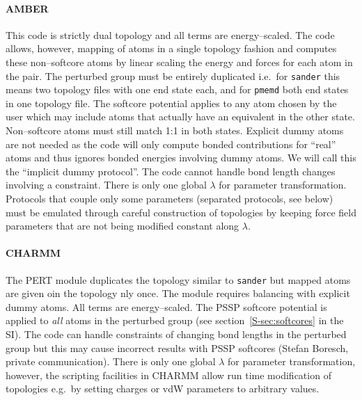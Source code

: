\documentclass[journal=jctcce,manuscript=article]{achemso}
\newcommand{\progname}[1]{\texttt{#1}}
\begin{document}
\paragraph{AMBER} %
This code is strictly dual topology and all terms
are energy--scaled.
The code allows, however, mapping of atoms in a
single topology fashion and computes these non--softcore atoms 
by linear scaling the energy and forces for each atom in the pair.
The perturbed group must be entirely duplicated i.e.\ for \progname{sander} 
this means two topology files with one end state each, and for \progname{pmemd} 
both end states in one topology file.  The softcore potential applies to any 
atom chosen by the user which may include atoms that actually have an 
equivalent in the other state.  Non--softcore atoms must still match 1:1 in 
both states.  Explicit dummy atoms are not needed as the code will only compute 
bonded contributions for ``real'' atoms and thus ignores bonded energies 
involving dummy atoms.  We will call this the ``implicit dummy protocol''. The 
code cannot handle bond length changes involving a constraint.  There is only 
one global $\lambda$ for parameter transformation.  Protocols that couple only 
some parameters (separated protocols, see below) must be emulated through 
careful construction of topologies by keeping force field parameters that are 
not being modified constant along $\lambda$.

\paragraph{CHARMM} The PERT module duplicates the topology similar to
\progname{sander} but mapped atoms are given oin the topology nly once.
The module requires balancing with explicit dummy atoms.  All terms are
energy--scaled.  The PSSP softcore potential is applied to \emph{all}
atoms in the perturbed group (see section~\ref{S-sec:softcores} in the SI).  The 
code can handle constraints of changing bond lengths in the perturbed group but this
may cause incorrect results with PSSP softcores (Stefan Boresch, private
communication).  There is only one global $\lambda$ for parameter
transformation, however, the scripting facilities in CHARMM allow run time
modification of topologies e.g.\ by setting charges or vdW parameters
to arbitrary values.
\end{document}
